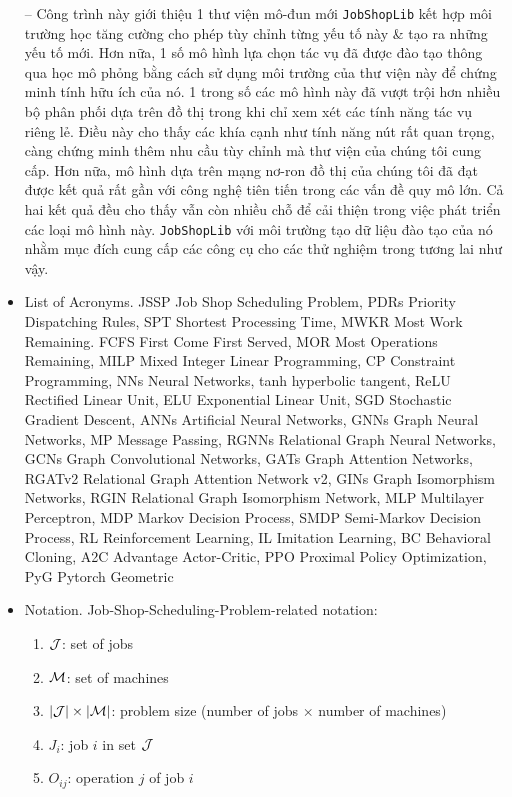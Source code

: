\documentclass{article}
\begin{document}
\begin{itemize}
    -- Công trình này giới thiệu 1 thư viện mô-đun mới {\tt JobShopLib} kết hợp môi trường học tăng cường cho phép tùy chỉnh từng yếu tố này \& tạo ra những yếu tố mới. Hơn nữa, 1 số mô hình lựa chọn tác vụ đã được đào tạo thông qua học mô phỏng bằng cách sử dụng môi trường của thư viện này để chứng minh tính hữu ích của nó. 1 trong số các mô hình này đã vượt trội hơn nhiều bộ phân phối dựa trên đồ thị trong khi chỉ xem xét các tính năng tác vụ riêng lẻ. Điều này cho thấy các khía cạnh như tính năng nút rất quan trọng, càng chứng minh thêm nhu cầu tùy chỉnh mà thư viện của chúng tôi cung cấp. Hơn nữa, mô hình dựa trên mạng nơ-ron đồ thị của chúng tôi đã đạt được kết quả rất gần với công nghệ tiên tiến trong các vấn đề quy mô lớn. Cả hai kết quả đều cho thấy vẫn còn nhiều chỗ để cải thiện trong việc phát triển các loại mô hình này. {\tt JobShopLib} với môi trường tạo dữ liệu đào tạo của nó nhằm mục đích cung cấp các công cụ cho các thử nghiệm trong tương lai như vậy.
    \item {\sf List of Acronyms.} JSSP Job Shop Scheduling Problem, PDRs Priority Dispatching Rules, SPT Shortest Processing Time, MWKR Most Work Remaining. FCFS First Come First Served, MOR Most Operations Remaining, MILP Mixed Integer Linear Programming, CP Constraint Programming, NNs Neural Networks, tanh hyperbolic tangent, ReLU Rectified Linear Unit, ELU Exponential Linear Unit, SGD Stochastic Gradient Descent, ANNs Artificial Neural Networks, GNNs Graph Neural Networks, MP Message Passing, RGNNs Relational Graph Neural Networks, GCNs Graph Convolutional Networks, GATs Graph Attention Networks, RGATv2 Relational Graph Attention Network v2, GINs Graph Isomorphism Networks, RGIN Relational Graph Isomorphism Network, MLP Multilayer Perceptron, MDP Markov Decision Process, SMDP Semi-Markov Decision Process, RL Reinforcement Learning, IL Imitation Learning, BC Behavioral Cloning, A2C Advantage Actor-Critic, PPO Proximal Policy Optimization, PyG Pytorch Geometric
    \item {\sf Notation.} Job-Shop-Scheduling-Problem-related notation:
    \begin{enumerate}
        \item ${\cal J}$: set of jobs
        \item ${\cal M}$: set of machines
        \item $|{\cal J}|\times|{\cal M}|$: problem size (number of jobs $\times$ number of machines)
        \item $J_i$: job $i$ in set ${\cal J}$
        \item $O_{ij}$: operation $j$ of job $i$

\end{enumerate}
\end{itemize}
\end{document}
